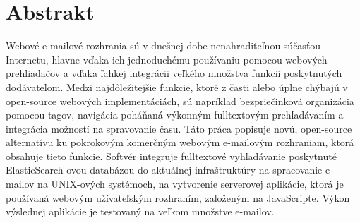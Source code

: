 \documentclass[12pt,a4paper]{report}
\title{}
\author{}
\begin{document}
	\pagestyle{empty}
\section*{Abstrakt}
Webové e-mailové rozhrania sú v dnešnej dobe nenahraditeľnou súčasťou Internetu, hlavne vďaka ich jednoduchému používaniu pomocou webových prehliadačov a vďaka ľahkej integrácii veľkého množstva funkcií poskytnutých dodávateľom. Medzi najdôležitejšie funkcie, ktoré z časti alebo úplne chýbajú v open-source webových implementáciách, sú napríklad bezpriečinková organizácia pomocou tagov, navigácia poháňaná výkonným fulltextovým prehľadávaním a integrácia možností na spravovanie času. Táto práca popisuje novú, open-source alternatívu ku pokrokovým komerčným webovým e-mailovým rozhraniam, ktorá obsahuje tieto funkcie. Softvér integruje fulltextové vyhľadávanie poskytnuté ElasticSearch-ovou databázou do aktuálnej infraštruktúry na spracovanie e-mailov na UNIX-ových systémoch, na vytvorenie serverovej aplikácie, ktorá je používaná webovým užívateľským rozhraním, založeným na JavaScripte. Výkon výslednej aplikácie je testovaný na veľkom množstve e-mailov. 
\end{document}
